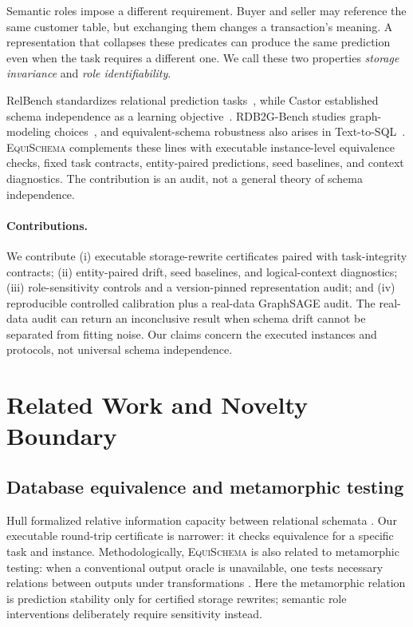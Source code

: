 \documentclass[runningheads]{llncs}
\newcommand{\method}{\textsc{EquiSchema}\xspace}
\begin{document}
Semantic roles impose a different requirement. Buyer and seller may reference the same customer table, but exchanging them changes a transaction's meaning. A representation that collapses these predicates can produce the same prediction even when the task requires a different one. We call these two properties \emph{storage invariance} and \emph{role identifiability}.

RelBench standardizes relational prediction tasks~\cite{robinson2024relbench}, while Castor established schema independence as a learning objective~\cite{picado2017schema}. RDB2G-Bench studies graph-modeling choices~\cite{choi2025rdb2g}, and equivalent-schema robustness also arises in Text-to-SQL~\cite{kanchinadam2026schemas}. \method complements these lines with executable instance-level equivalence checks, fixed task contracts, entity-paired predictions, seed baselines, and context diagnostics. The contribution is an audit, not a general theory of schema independence.

\paragraph{Contributions.}
We contribute (i) executable storage-rewrite certificates paired with task-integrity contracts; (ii) entity-paired drift, seed baselines, and logical-context diagnostics; (iii) role-sensitivity controls and a version-pinned representation audit; and (iv) reproducible controlled calibration plus a real-data GraphSAGE audit. The real-data audit can return an inconclusive result when schema drift cannot be separated from fitting noise. Our claims concern the executed instances and protocols, not universal schema independence.

\section{Related Work and Novelty Boundary}\label{sec:related}
\subsection{Database equivalence and metamorphic testing}
Hull formalized relative information capacity between relational schemata \cite{hull1986capacity}. Our executable round-trip certificate is narrower: it checks equivalence for a specific task and instance. Methodologically, \method is also related to metamorphic testing: when a conventional output oracle is unavailable, one tests necessary relations between outputs under transformations \cite{xie2011metamorphic}. Here the metamorphic relation is prediction stability only for certified storage rewrites; semantic role interventions deliberately require sensitivity instead.
\end{document}

